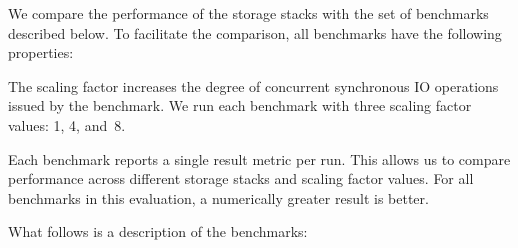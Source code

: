 \documentclass[12pt,a4paper,twoside]{book}
\begin{document}
We compare the performance of the storage stacks with the set of benchmarks described below.
To facilitate the comparison, all benchmarks have the following properties:
\begin{description}[noitemsep,leftmargin=1.5cm,labelindent=1cm]
    \item[Scaling Factor] The scaling factor increases the degree of concurrent synchronous IO operations issued by the benchmark.
        We run each benchmark with three scaling factor values: 1, 4, and~8.
    \item[Result Metric] Each benchmark reports a single result metric per run.
        This allows us to compare performance across different storage stacks and scaling factor values.
        For all benchmarks in this evaluation, a numerically greater result is better.
\end{description}
What follows is a description of the benchmarks:
\end{document}
